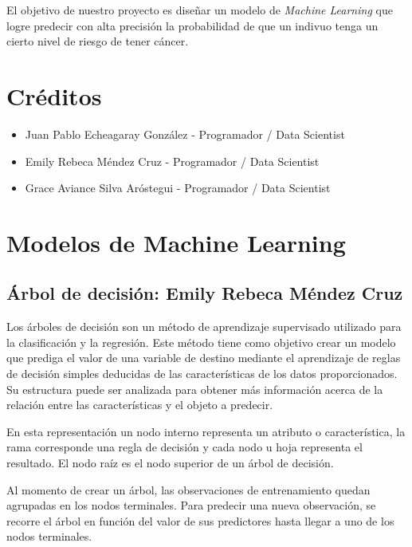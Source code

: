 \documentclass[journal]{IEEEtran}                                                          %
\begin{document}
        El objetivo de nuestro proyecto es diseñar un modelo de \emph{Machine Learning} que logre predecir con alta precisión la probabilidad de que un indivuo tenga un cierto nivel de riesgo de tener cáncer.
    
    \section{Créditos} \label{credits}
       
        \begin{itemize}
            \item Juan Pablo Echeagaray González - Programador / Data Scientist
            \item Emily Rebeca Méndez Cruz - Programador / Data Scientist
            \item Grace Aviance Silva Aróstegui - Programador / Data Scientist
        \end{itemize}

    \section{Modelos de Machine Learning} \label{modelos}

        \subsection{Árbol de decisión: Emily Rebeca Méndez Cruz} \label{decision-tree}

            Los árboles de decisión son un método de aprendizaje supervisado utilizado para la clasificación y la regresión. Este método tiene como objetivo crear un modelo que prediga el valor de una variable de destino mediante el aprendizaje de reglas de decisión simples deducidas de las características de los datos proporcionados. Su estructura puede ser analizada para obtener más información acerca de la relación entre las características y el objeto a predecir.

            En esta representación un nodo interno representa un atributo o característica, la rama corresponde una regla de decisión y cada nodo u hoja representa el resultado. El nodo raíz es el nodo superior de un árbol de decisión.

            Al momento de crear un árbol, las observaciones de entrenamiento quedan agrupadas en los nodos terminales. Para predecir una nueva observación, se recorre el árbol en función del valor de sus predictores hasta llegar a uno de los nodos terminales.
\end{document}
